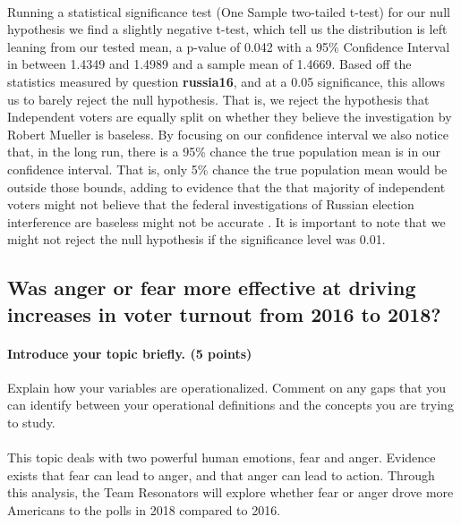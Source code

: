 \documentclass[12pt]{article}
\begin{document}
\paragraph{}
Running a statistical significance test (One Sample two-tailed t-test) for our null hypothesis we find a slightly negative t-test, which tell us the distribution is left leaning from our tested mean, a p-value of 0.042 with a 95\% Confidence Interval in between 1.4349 and 1.4989 and a sample mean of 1.4669. Based off the statistics measured by question \textbf{russia16}, and at a 0.05 significance, this allows us to barely reject the null hypothesis. That is, we reject the hypothesis that Independent voters are equally split on whether they believe the investigation by Robert Mueller is baseless. By focusing on our confidence interval we also notice that, in the long run, there is a 95\% chance the true population mean is in our confidence interval. That is, only 5\% chance the true population mean would be outside those bounds, adding to evidence that the that majority of independent voters might not believe that the federal investigations of Russian election interference are baseless might not be accurate . It is important to note that we might not reject the null hypothesis if the significance level was 0.01. 

\subsection{Was anger or fear more effective at driving increases in voter turnout from 2016 to 2018?}
\paragraph{Introduce your topic briefly. (5 points)}
Explain how your variables are operationalized. Comment on any gaps that you can identify between your operational definitions and the concepts you are trying to study.
\paragraph{}
This topic deals with two powerful human emotions, fear and anger.  Evidence exists that fear can lead to anger, and that anger can lead to action.  Through this analysis, the Team Resonators will explore whether fear or anger drove more Americans to the polls in 2018 compared to 2016.  
\end{document}
